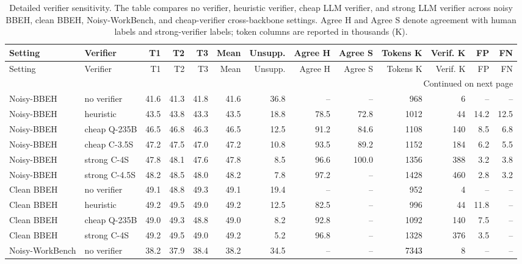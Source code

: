 ﻿\begingroup
\scriptsize
\setlength{\tabcolsep}{2.0pt}
\setlength{\LTleft}{\fill}
\setlength{\LTright}{\fill}
\begin{longtable}{llrrrrrrrrrrr}
\caption{Detailed verifier sensitivity. The table compares no verifier, heuristic verifier, cheap LLM verifier, and strong LLM verifier across noisy BBEH, clean BBEH, Noisy-WorkBench, and cheap-verifier cross-backbone settings. Agree H and Agree S denote agreement with human labels and strong-verifier labels; token columns are reported in thousands (K).}\label{tab:verifier-sensitivity-detailed}\\
\toprule
Setting & Verifier & T1 & T2 & T3 & Mean & Unsupp. & Agree H & Agree S & Tokens K & Verif. K & FP & FN \\
\midrule
\endfirsthead
\toprule
Setting & Verifier & T1 & T2 & T3 & Mean & Unsupp. & Agree H & Agree S & Tokens K & Verif. K & FP & FN \\
\midrule
\endhead
\midrule
\multicolumn{13}{r}{\scriptsize Continued on next page}\\
\endfoot
\bottomrule
\endlastfoot
Noisy-BBEH & no verifier & 41.6 & 41.3 & 41.8 & 41.6 & 36.8 & -- & -- & 968 & 6 & -- & -- \\
Noisy-BBEH & heuristic & 43.5 & 43.8 & 43.3 & 43.5 & 18.8 & 78.5 & 72.8 & 1012 & 44 & 14.2 & 12.5 \\
Noisy-BBEH & cheap Q-235B & 46.5 & 46.8 & 46.3 & 46.5 & 12.5 & 91.2 & 84.6 & 1108 & 140 & 8.5 & 6.8 \\
Noisy-BBEH & cheap C-3.5S & 47.2 & 47.5 & 47.0 & 47.2 & 10.8 & 93.5 & 89.2 & 1152 & 184 & 6.2 & 5.5 \\
\rowcolor{tracesoft}
Noisy-BBEH & strong C-4S & 47.8 & 48.1 & 47.6 & 47.8 & 8.5 & 96.6 & 100.0 & 1356 & 388 & 3.2 & 3.8 \\
Noisy-BBEH & strong C-4.5S & 48.2 & 48.5 & 48.0 & 48.2 & 7.8 & 97.2 & -- & 1428 & 460 & 2.8 & 3.2 \\
\midrule
Clean BBEH & no verifier & 49.1 & 48.8 & 49.3 & 49.1 & 19.4 & -- & -- & 952 & 4 & -- & -- \\
Clean BBEH & heuristic & 49.2 & 49.5 & 49.0 & 49.2 & 12.5 & 82.5 & -- & 996 & 44 & 11.8 & -- \\
Clean BBEH & cheap Q-235B & 49.0 & 49.3 & 48.8 & 49.0 & 8.2 & 92.8 & -- & 1092 & 140 & 7.5 & -- \\
Clean BBEH & strong C-4S & 49.2 & 49.5 & 49.0 & 49.2 & 5.2 & 96.8 & -- & 1328 & 376 & 3.5 & -- \\
\midrule
Noisy-WorkBench & no verifier & 38.2 & 37.9 & 38.4 & 38.2 & 34.5 & -- & -- & \textcolor{black}{7343} & 8 & -- & -- \\

\end{longtable}
